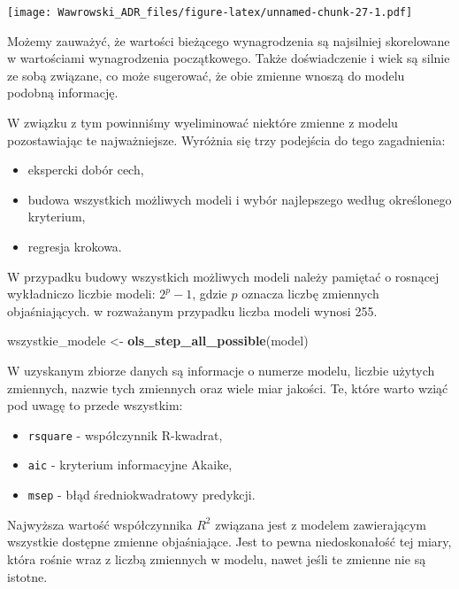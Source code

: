 \documentclass[
]{book}
\newenvironment{Shaded}{\begin{snugshade}}{\end{snugshade}}
\newcommand{\KeywordTok}[1]{\textcolor[rgb]{0.13,0.29,0.53}{\textbf{#1}}}
\newcommand{\NormalTok}[1]{#1}
\newcommand{\StringTok}[1]{\textcolor[rgb]{0.31,0.60,0.02}{#1}}
\providecommand{\tightlist}{%
  \setlength{\itemsep}{0pt}\setlength{\parskip}{0pt}}
\begin{document}
\texttt{[image: Wawrowski\_ADR\_files/figure-latex/unnamed-chunk-27-1.pdf]}

Możemy zauważyć, że wartości bieżącego wynagrodzenia są najsilniej skorelowane w wartościami wynagrodzenia początkowego. Także doświadczenie i wiek są silnie ze sobą związane, co może sugerować, że obie zmienne wnoszą do modelu podobną informację.

W związku z tym powinniśmy wyeliminować niektóre zmienne z modelu pozostawiając te najważniejsze. Wyróżnia się trzy podejścia do tego zagadnienia:

\begin{itemize}
\tightlist
\item
  ekspercki dobór cech,
\item
  budowa wszystkich możliwych modeli i wybór najlepszego według określonego kryterium,
\item
  regresja krokowa.
\end{itemize}

W przypadku budowy wszystkich możliwych modeli należy pamiętać o rosnącej wykładniczo liczbie modeli: \(2^p-1\), gdzie \(p\) oznacza liczbę zmiennych objaśniających. w rozważanym przypadku liczba modeli wynosi 255.

\begin{Shaded}
\begin{Highlighting}[]
\NormalTok{wszystkie_modele <-}\StringTok{ }\KeywordTok{ols_step_all_possible}\NormalTok{(model)}
\end{Highlighting}
\end{Shaded}

W uzyskanym zbiorze danych są informacje o numerze modelu, liczbie użytych zmiennych, nazwie tych zmiennych oraz wiele miar jakości. Te, które warto wziąć pod uwagę to przede wszystkim:

\begin{itemize}
\tightlist
\item
  \texttt{rsquare} - współczynnik R-kwadrat,
\item
  \texttt{aic} - kryterium informacyjne Akaike,
\item
  \texttt{msep} - błąd średniokwadratowy predykcji.
\end{itemize}

Najwyższa wartość współczynnika \(R^2\) związana jest z modelem zawierającym wszystkie dostępne zmienne objaśniające. Jest to pewna niedoskonałość tej miary, która rośnie wraz z liczbą zmiennych w modelu, nawet jeśli te zmienne nie są istotne.
\end{document}
